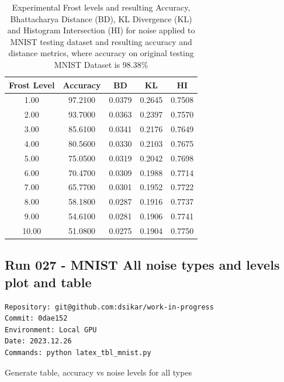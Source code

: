 \begin{table}[ht]
\centering
\begin{tabular}{|c|c|c|c|c|}
\hline
Frost Level & Accuracy & BD & KL & HI \\
\hline

1.00 & 97.2100 & 0.0379 & 0.2645 & 0.7508 \\
2.00 & 93.7000 & 0.0363 & 0.2397 & 0.7570 \\
3.00 & 85.6100 & 0.0341 & 0.2176 & 0.7649 \\
4.00 & 80.5600 & 0.0330 & 0.2103 & 0.7675 \\
5.00 & 75.0500 & 0.0319 & 0.2042 & 0.7698 \\
6.00 & 70.4700 & 0.0309 & 0.1988 & 0.7714 \\
7.00 & 65.7700 & 0.0301 & 0.1952 & 0.7722 \\
8.00 & 58.1800 & 0.0287 & 0.1916 & 0.7737 \\
9.00 & 54.6100 & 0.0281 & 0.1906 & 0.7741 \\
10.00 & 51.0800 & 0.0275 & 0.1904 & 0.7750 \\


\hline
\end{tabular}
\caption{Experimental Frost levels and resulting Accuracy, Bhattacharya Distance (BD), KL Divergence (KL) and Histogram Intersection (HI) for noise applied to MNIST testing dataset and resulting accuracy and distance metrics, where accuracy on original testing MNIST Dataset is 98.38\%}
\label{tbl-snow-levels}
\end{table}


\subsection{Run 027 - MNIST All noise types and levels plot and table}
\label{app_res:027}
\begin{verbatim}
Repository: git@github.com:dsikar/work-in-progress
Commit: 0dae152
Environment: Local GPU
Date: 2023.12.26
Commands: python latex_tbl_mnist.py
\end{verbatim}

Generate table, accuracy vs noise levels for all types

